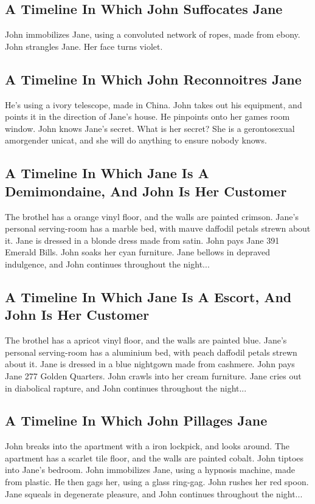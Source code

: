 \documentclass{article}
\begin{document}
\subsection{A Timeline In Which John Suffocates Jane}


John immobilizes Jane, using a convoluted network of ropes, made from ebony.
John strangles Jane.
Her face turns violet.
\subsection{A Timeline In Which John Reconnoitres Jane}


He's using a ivory telescope, made in China.
John takes out his equipment, and points it in the direction of Jane's house. He pinpoints onto her games room window.
John knows Jane's secret. What is her secret? She is a gerontosexual amorgender unicat, and she will do anything to ensure nobody knows.
\subsection{A Timeline In Which Jane Is A Demimondaine, And John Is Her Customer}


The brothel has a orange vinyl floor, and the walls are painted crimson.
Jane's personal serving{-}room has a marble bed, with mauve daffodil petals strewn about it.
Jane is dressed in a blonde dress made from satin.
John pays Jane 391 Emerald Bills.
John soaks her cyan furniture.
Jane bellows in depraved indulgence, and John continues throughout the night...
\subsection{A Timeline In Which Jane Is A Escort, And John Is Her Customer}


The brothel has a apricot vinyl floor, and the walls are painted blue.
Jane's personal serving{-}room has a aluminium bed, with peach daffodil petals strewn about it.
Jane is dressed in a blue nightgown made from cashmere.
John pays Jane 277 Golden Quarters.
John crawls into her cream furniture.
Jane cries out in diabolical rapture, and John continues throughout the night...
\subsection{A Timeline In Which John Pillages Jane}


John breaks into the apartment with a iron lockpick, and looks around.
The apartment has a scarlet tile floor, and the walls are painted cobalt.
John tiptoes into Jane's bedroom.
John immobilizes Jane, using a hypnosis machine, made from plastic.
He then gags her, using a glass ring{-}gag.
John rushes her red spoon.
Jane squeals in degenerate pleasure, and John continues throughout the night...
\end{document}
